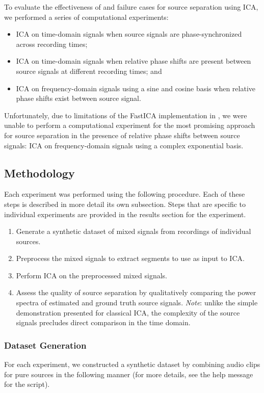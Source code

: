 \documentclass[10pt]{article}
\begin{document}
To evaluate the effectiveness of and failure cases for source separation using ICA, we
performed a series of computational experiments:
\begin{itemize}
    \item ICA on time-domain signals when source signals are phase-synchronized across
        recording times;
    \item ICA on time-domain signals when relative phase shifts are present between source
        signals at different recording times; and
    \item ICA on frequency-domain signals using a sine and cosine basis when relative phase
        shifts exist between source signal.
\end{itemize}
Unfortunately, due to limitations of the FastICA implementation in , we
were unable to perform a computational experiment for the most promising approach for
source separation in the presence of relative phase shifts between source signals: ICA on
frequency-domain signals using a complex exponential basis.

\subsection*{Methodology}
Each experiment was performed using the following procedure. Each of these steps is
described in more detail its own subsection. Steps that are specific to individual
experiments are provided in the results section for the experiment.

\begin{enumerate}
    \item Generate a synthetic dataset of mixed signals from recordings of individual
        sources.

    \item Preprocess the mixed signals to extract segments to use as input to ICA.

    \item Perform ICA on the preprocessed mixed signals.

    \item Assess the quality of source separation by qualitatively comparing the power
        spectra of estimated and ground truth source signals. \emph{Note}: unlike the
        simple demonstration presented for classical ICA, the complexity of the source
        signals precludes direct comparison in the time domain.
\end{enumerate}

\subsubsection*{Dataset Generation}
For each experiment, we constructed a synthetic dataset by combining audio clips for pure
sources in the following manner (for more details, see the help message for the
\newline{} script).
\end{document}
